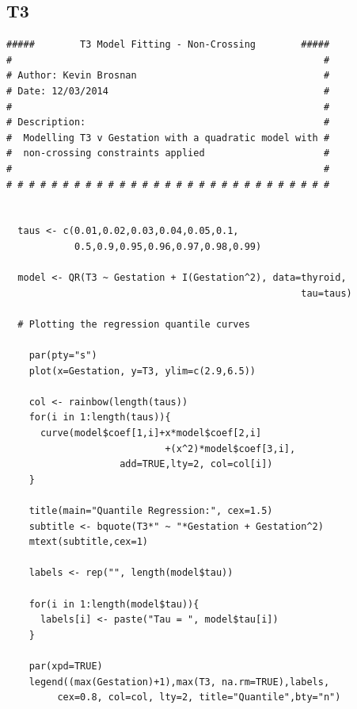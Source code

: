 \documentclass[12pt,a4paper]{report}
\begin{document}
\subsection*{T3}
\begin{lstlisting}
#####        T3 Model Fitting - Non-Crossing        #####
#                                                       #
# Author: Kevin Brosnan                                 #
# Date: 12/03/2014                                      #
#                                                       #
# Description:                                          #
#  Modelling T3 v Gestation with a quadratic model with #
#  non-crossing constraints applied                     #
#                                                       #
# # # # # # # # # # # # # # # # # # # # # # # # # # # # #


  taus <- c(0.01,0.02,0.03,0.04,0.05,0.1,
            0.5,0.9,0.95,0.96,0.97,0.98,0.99)

  model <- QR(T3 ~ Gestation + I(Gestation^2), data=thyroid,
                                                    tau=taus)

  # Plotting the regression quantile curves

    par(pty="s")
    plot(x=Gestation, y=T3, ylim=c(2.9,6.5))

    col <- rainbow(length(taus))
    for(i in 1:length(taus)){
      curve(model$coef[1,i]+x*model$coef[2,i]
                            +(x^2)*model$coef[3,i],
                    add=TRUE,lty=2, col=col[i])
    }

    title(main="Quantile Regression:", cex=1.5)
    subtitle <- bquote(T3*" ~ "*Gestation + Gestation^2)
    mtext(subtitle,cex=1)

    labels <- rep("", length(model$tau))

    for(i in 1:length(model$tau)){
      labels[i] <- paste("Tau = ", model$tau[i])
    }

    par(xpd=TRUE)
    legend((max(Gestation)+1),max(T3, na.rm=TRUE),labels,
         cex=0.8, col=col, lty=2, title="Quantile",bty="n")
\end{lstlisting}
\end{document}
